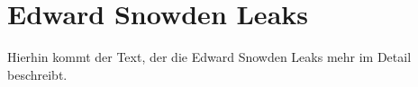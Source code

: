 \section{Edward Snowden Leaks}
Hierhin kommt der Text, der die Edward Snowden Leaks mehr im Detail beschreibt.
